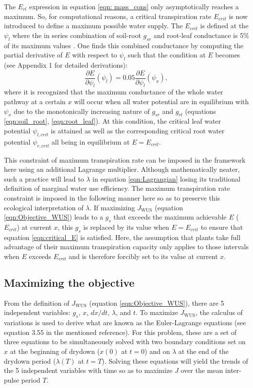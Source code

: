 \documentclass[utf8]{frontiersSCNS} %
\begin{document}
The $E_{rl}$ expression in equation \ref{eqn: mass_cons} only asymptotically reaches a maximum. So, for computational reasons, a critical transpiration rate $E_{crit}$ is now introduced to define a maximum possible water supply. The $E_{crit}$ is defined at the $\psi_l$ where the in series combination of soil-root $g_{sr}$ and root-leaf conductance is 5\% of its maximum values \citep{sperry_predicting_2017}. One finds this combined conductance by computing the partial derivative of $E$ with respect to $\psi_l$ such that the condition at $E$ becomes (see Appendix 1 for detailed derivations):
\begin{equation}
    \label{eqn:critical_E}
    \frac{\partial E}{\partial \psi_l} (\psi_l) = 0.05 \frac{\partial E}{\partial \psi_l} (\psi_x),
\end{equation}
where it is recognized that the maximum conductance of the whole water pathway at a certain $x$ will occur when all water potential are in equilibrium with $\psi_x$ due to the monotonically increasing nature of $g_{sr}$ and $g_{rl}$ (equations \ref{eqn:soil_root}, \ref{eqn:root_leaf}). At this condition, the critical leaf water potential $\psi_{l,crit}$ is attained as well as the corresponding critical root water potential $\psi_{r,crit}$ all being in equilibrium at $E = E_{crit}$.

This constraint of maximum transpiration rate can be imposed in the framework here using an additional Lagrange multiplier. Although mathematically neater, such a practice will lead to $\lambda$ in equation \ref{eqn:Lagrangian} losing its traditional definition of marginal water use efficiency. The maximum transpiration rate constraint is imposed in the following manner here so as to preserve this ecological interpretation of $\lambda$.  If maximizing $J_{\text{WUS}}$ (equation \ref{eqn:Objective_WUS}) leads to a $g_s$ that exceeds the maximum achievable $E$ ($E_{crit}$) at current $x$, this $g_s$ is replaced by its value when $E = E_{crit}$ to ensure that equation \ref{eqn:critical_E} is satisfied. Here, the assumption that plants take full advantage of their maximum transpiration capacity only applies to those intervals when $E$ exceeds $E_{crit}$ and is therefore forcibly set to its value at current $x$.

\subsection{Maximizing the objective}

From the definition of $J_{\text{WUS}}$ (equation \ref{eqn:Objective_WUS}), there are 5 independent variables: $g_s$, $x$, $dx / dt$, $\lambda$, and $t$. To maximize $J_{\text{WUS}}$, the calculus of variations \citep{witelski_variational_2015} is used to derive what are known as the Euler-Lagrange equations (see equation 3.55 in the mentioned reference). For this problem, these are a set of three equations to be simultaneously solved with two boundary conditions set on $x$ at the beginning of drydown ($x(0)$ at $t=0$) and on $\lambda$ at the end of the drydown period ($\lambda(T)$ at $t=T$). Solving these equations will yield the trends of the 5 independent variables with time so as to maximize $J$ over the mean inter-pulse period $T$.
\end{document}
